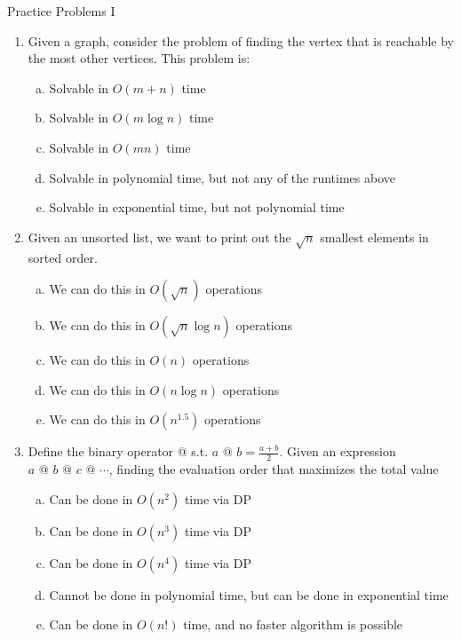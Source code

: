 \documentclass{beamer}
\begin{document}
\begin{frame}[t]{Practice Problems I}
    \begin{enumerate}
        \item Given a graph, consider the problem of finding the vertex that is reachable by the most other vertices. This problem is:
        \begin{enumerate}[(a)]
            \item Solvable in $O(m + n)$ time
            \item Solvable in $O(m \log n)$ time
            \item Solvable in $O(mn)$ time
            \item Solvable in polynomial time, but not any of the runtimes above
            \item Solvable in exponential time, but not polynomial time
        \end{enumerate}
        \pause \item Given an unsorted list, we want to print out the $\sqrt{n}$ smallest elements in sorted order.
        \begin{enumerate}[(a)]
            \item We can do this in $O(\sqrt{n})$ operations
            \item We can do this in $O(\sqrt{n} \log n)$ operations
            \item We can do this in $O(n)$ operations
            \item We can do this in $O(n \log n)$ operations
            \item We can do this in $O(n^{1.5})$ operations
        \end{enumerate}
        \pause \item Define the binary operator @ s.t. $a\text{ @ }b = \frac{a + b}{2}$. Given an expression $a\text{ @ }b\text{ @ }c\text{ @ }\dotsb$, finding the evaluation order that maximizes the total value
        \begin{enumerate}[(a)]
            \item Can be done in $O(n^2)$ time via DP
            \item Can be done in $O(n^3)$ time via DP
            \item Can be done in $O(n^4)$ time via DP
            \item Cannot be done in polynomial time, but can be done in exponential time
            \item Can be done in $O(n!)$ time, and no faster algorithm is possible
        \end{enumerate}
    \end{enumerate}
\end{frame}
\end{document}
